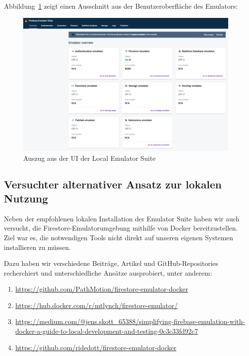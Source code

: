 \documentclass[12pt,a4paper%
              ,oneside     %
              ,titlepage
              ,DIV=13
              ,headinclude
              ,footinclude=false%
              ,cleardoublepage=empty%
              ,parskip=half,
              BCOR=0mm,
              ]{scrreprt}
\begin{document}
Abbildung~\ref{fig:emulator-ui} zeigt einen Ausschnitt aus der Benutzeroberfläche des Emulators:

\begin{figure}[H]
	\centering
	\includegraphics[width=\linewidth]{img/emulator_ui.png}
	\caption{Auszug aus der UI der Local Emulator Suite}
	\label{fig:emulator-ui}
\end{figure}

\subsection{Versuchter alternativer Ansatz zur lokalen Nutzung}

Neben der empfohlenen lokalen Installation der Emulator Suite haben wir auch versucht, die Firestore-Emulatorumgebung mithilfe von Docker bereitzustellen. Ziel war es, die notwendigen Tools nicht direkt auf unseren eigenen Systemen installieren zu müssen.

Dazu haben wir verschiedene Beiträge, Artikel und GitHub-Repositories recherchiert und unterschiedliche Ansätze ausprobiert, unter anderem:

\begin{enumerate}
	\item \url{https://github.com/PathMotion/firestore-emulator-docker}
	\item \url{https://hub.docker.com/r/mtlynch/firestore-emulator/}
	\item \url{https://medium.com/@jens.skott_65388/simplifying-firebase-emulation-with-docker-a-guide-to-local-development-and-testing-0c3c33fd92c7}
	\item \url{https://github.com/ridedott/firestore-emulator-docker}
\end{enumerate}
\end{document}
